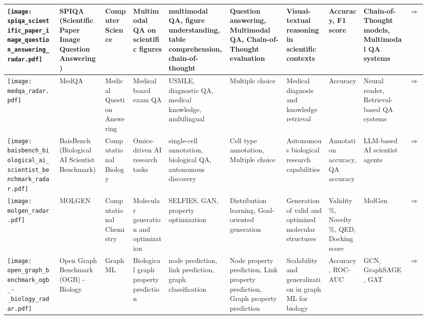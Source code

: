 \begin{landscape}
{\begin{longtable}{|p{}|p{}|p{}|p{}|p{}|p{}|p{}|p{}|p{}|p{}|}
\texttt{[image: spiqa\_scientific\_paper\_image\_question\_answering\_radar.pdf]} & SPIQA (Scientific Paper Image Question Answering) & Computer Science & Multimodal QA on scientific figures & multimodal QA, figure understanding, table comprehension, chain-of-thought & Question answering, Multimodal QA, Chain-of-Thought evaluation & Visual-textual reasoning in scientific contexts & Accuracy, F1 score & Chain-of-Thought models, Multimodal QA systems & \cite{zhong2024spiqa}\href{https://arxiv.org/abs/2407.09413}{$\Rightarrow$} \\ \hline
\texttt{[image: medqa\_radar.pdf]} & MedQA & Medical Question Answering & Medical board exam QA & USMLE, diagnostic QA, medical knowledge, multilingual & Multiple choice & Medical diagnosis and knowledge retrieval & Accuracy & Neural reader, Retrieval-based QA systems & \cite{jin2020diseasedoespatienthave}\href{https://arxiv.org/abs/2009.13081}{$\Rightarrow$} \\ \hline
\texttt{[image: baisbench\_biological\_ai\_scientist\_benchmark\_radar.pdf]} & BaisBench (Biological AI Scientist Benchmark) & Computational Biology & Omics-driven AI research tasks & single-cell annotation, biological QA, autonomous discovery & Cell type annotation, Multiple choice & Autonomous biological research capabilities & Annotation accuracy, QA accuracy & LLM-based AI scientist agents & \cite{luo2025benchmarkingaiscientistsomics}\href{https://arxiv.org/abs/2505.08341}{$\Rightarrow$} \\ \hline
\texttt{[image: molgen\_radar.pdf]} & MOLGEN & Computational Chemistry & Molecular generation and optimization & SELFIES, GAN, property optimization & Distribution learning, Goal-oriented generation & Generation of valid and optimized molecular structures & Validity\%, Novelty\%, QED, Docking score & MolGen & \cite{fang2024domainagnosticmoleculargenerationchemical}\href{https://github.com/zjunlp/MolGen}{$\Rightarrow$} \\ \hline
\texttt{[image: open\_graph\_benchmark\_ogb\_-\_biology\_radar.pdf]} & Open Graph Benchmark (OGB) - Biology & Graph ML & Biological graph property prediction & node prediction, link prediction, graph classification & Node property prediction, Link property prediction, Graph property prediction & Scalability and generalization in graph ML for biology & Accuracy, ROC-AUC & GCN, GraphSAGE, GAT & \cite{hu2021opengraphbenchmarkdatasets}\href{https://ogb.stanford.edu/docs/home/}{$\Rightarrow$} \\ \hline

\end{longtable}}
\end{landscape}
